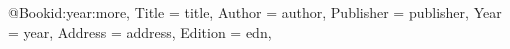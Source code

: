 @Book{id:year:more,     
  Title                    = {title},     
  Author                   = {author},     
  Publisher                = {publisher},     
  Year                     = {year},     
  Address                  = {address},     
  Edition                  = {edn},     
}   
